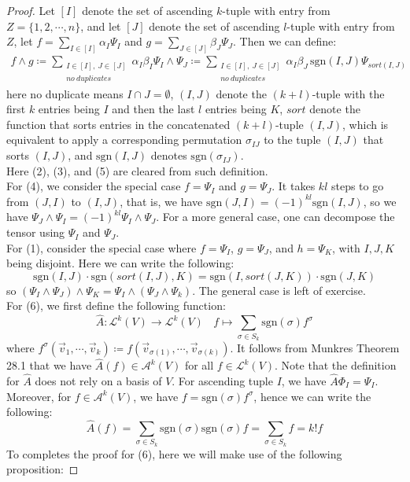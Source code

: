 \documentclass[15pt]{book}
\theoremstyle{break}
\theoremstyle{break}
\newcommand{\Lt}{\mathcal{L}}
\newcommand{\A}{\mathcal{A}}
\newcommand{\sgn}{\text{sgn}}
\begin{document}
\begin{proof}
Let $[I]$ denote the set of ascending $k$-tuple with entry from $Z = \{1,2,\cdots,n \}$, and let $[J]$ denote the set of ascending $l$-tuple with entry from $Z$, let $f = \sum_{I \in [I]} \alpha_I \Psi_I$ and $g = \sum_{J\in [J]}\beta_J \Psi_J$. Then we can define:
\begin{align*}
f \wedge g \coloneqq \sum\limits_{\substack{I\in [I], \ J\in [J]\\ no \ duplicates}} \alpha_I \beta_I \Psi_I \wedge \Psi_J \coloneqq \sum\limits_{\substack{I\in [I], \ J\in [J]\\ no \ duplicates}} \alpha_I  \beta_J \, \text{sgn}(I,J) \Psi_{sort(I,J)}
\end{align*}
here no duplicate means $I\cap J = \emptyset$, $(I,J)$ denote the $(k+l)$-tuple with the first $k$ entries being $I$ and then the last $l$ entries being $K$, $sort$ denote the function that sorts entries in the concatenated $(k+l)$-tuple $(I,J)$, which is equivalent to apply a corresponding permutation $\sigma_{IJ}$ to the tuple $(I,J)$ that sorts $(I,J)$, and $\text{sgn}(I,J)$ denotes $\sgn(\sigma_{IJ})$.\\ 

Here (2), (3), and (5) are cleared from such definition. \\

For (4), we consider the special case $f = \Psi_I$ and $g = \Psi_J$. It takes $kl$ steps to go from $(J,I)$ to $(I,J)$, that is, we have $\text{sgn}(J,I) = (-1)^{kl}\text{sgn}(I,J)$, so we have $\Psi_J \wedge \Psi_I  = (-1)^{kl}\Psi_I \wedge \Psi_J$. For a more general case, one can decompose the tensor using $\Psi_I$ and $\Psi_J$. \\

For (1), consider the special case where $f = \Psi_I$, $g = \Psi_J$, and $h = \Psi_K$, with $I,J,K$ being disjoint. Here we can write the following:
$$\text{sgn}(I,J)\cdot \text{sgn}(sort(I,J),K) = \text{sgn}(I, sort(J,K))\cdot \text{sgn}(J,K)$$ 
so $(\Psi_I \wedge \Psi_J) \wedge \Psi_K = \Psi_I \wedge (\Psi_J \wedge \Psi_k)$. The general case is left of exercise. \\

For (6), we first define the following function: 
$$\hat{A}: \Lt^k(V) \to \Lt^k(V) \ \ \ \ f\mapsto \sum_{\sigma \in S_k}\text{sgn}(\sigma) f^{\sigma}$$
where $f^\sigma(\vec{v}_1,\cdots, \vec{v}_k) \coloneqq f(\vec{v}_{\sigma(1)}, \cdots, \vec{v}_{\sigma(k)})$. It follows from Munkres Theorem 28.1 that we have $\hat{A}(f) \in \A^k(V)$ for all $f\in \Lt^k(V)$. Note that the definition for $\hat{A}$ does not rely on a basis of $V$. For ascending tuple $I$, we have $\hat{A}\Phi_{I} = \Psi_I$. Moreover, for $f \in \A^k(V)$, we have $f = \sgn(\sigma)f^\sigma$, hence we can write the following:
$$\hat{A}(f) =\sum_{\sigma \in S_k}\sgn(\sigma)\sgn(\sigma)f = \sum_{\sigma \in S_k} f = k! f$$
To completes the proof for (6), here we will make use of the following proposition:


\end{proof}
\end{document}
